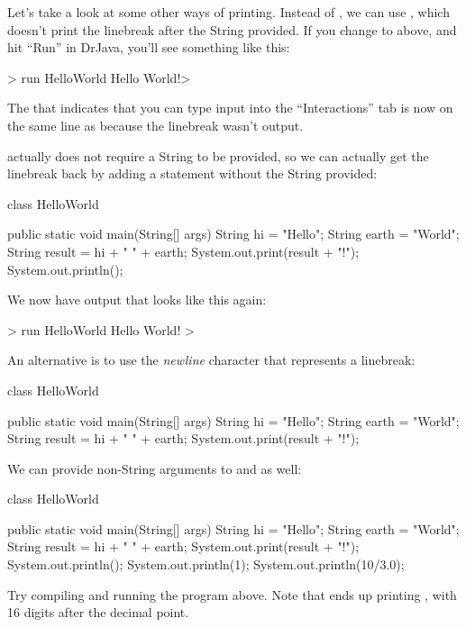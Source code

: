 Let's take a look at some other ways of printing.
Instead of , we can use , which
doesn't print the linebreak after the String provided.
If you change  to  above, and hit
``Run'' in DrJava, you'll see something like this:
\begin{code}
> run HelloWorld
Hello World!>
\end{code}
The \ic{>} that indicates that you can type input into the ``Interactions''
tab is now on the same line as  because the linebreak
wasn't output.

 actually does not require a String to be provided,
so we can actually get the linebreak back by adding a
 statement without the String provided:
\begin{code}
class HelloWorld {

    public static void main(String[] args) {
        String hi = "Hello";
        String earth = "World";
        String result = hi + " " + earth;
        System.out.print(result + "!");
        System.out.println();
    }

}
\end{code}
We now have output that looks like this again:
\begin{code}
> run HelloWorld
Hello World!
>
\end{code}

An alternative is to use the \emph{newline} character  that represents a
linebreak:
\begin{code}
class HelloWorld {

    public static void main(String[] args) {
        String hi = "Hello";
        String earth = "World";
        String result = hi + " " + earth;
        System.out.print(result + "!\n");
    }

}
\end{code}

We can provide non-String arguments to  and  as well:
\begin{code}
class HelloWorld {

    public static void main(String[] args) {
        String hi = "Hello";
        String earth = "World";
        String result = hi + " " + earth;
        System.out.print(result + "!");
        System.out.println();
        System.out.println(1);
        System.out.println(10/3.0);
    }

}
\end{code}
Try compiling and running the program above.
Note that  ends up printing
, with 16 digits after the decimal point.

